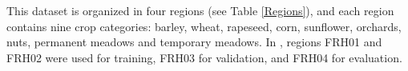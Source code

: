 \documentclass[journal,article,submit,pdftex,moreauthors]{Definitions/mdpi}
\begin{document}
This dataset is organized in four regions (see Table \ref{Regions}),
and each region contains nine crop categories: barley, wheat, rapeseed, corn, sunflower, orchards, nuts, permanent meadows and temporary meadows.
In \cite{Russwurm2020}, regions FRH01 and FRH02 were used for training, FRH03 for validation, and FRH04 for evaluation.

\end{document}
